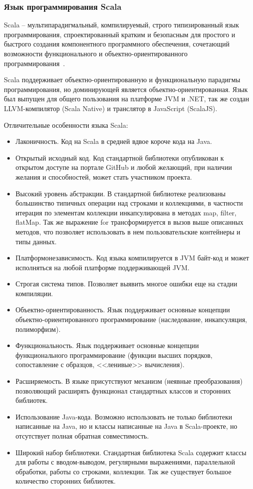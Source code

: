 \subsubsection{Язык программирования Scala}
\label{sub:techs:scala}
Scala – мультипарадигмальный, компилируемый, строго типизированный язык программирования, спроектированный кратким и безопасным для простого и быстрого создания компонентного программного обеспечения, сочетающий возможности функционального и объектно-ориентированного программирования~\cite{wiki_scala}.

Scala поддерживает объектно-ориентированную и функциональную парадигмы программирования, но доминирующей является объектно-ориентированная. Язык был выпущен для общего пользования на платформе JVM и .NET, так же создан LLVM-компилятор (Scala Native) и транслятор в JavaScript (ScalaJS).

Отличительные особенности языка Scala:
\begin{itemize}
  \item Лаконичность. Код на Scala в средней вдвое короче кода на Java.
  \item Открытый исходный код. Код стандартной библиотеки опубликован к открытом доступе на портале GitHub и любой желающий, при наличии желания и способностей, может стать участником проекта.
  \item Высокий уровень абстракции. В стандартной библиотеке реализованы большинство типичных операции над строками и коллекциями, в частности итерация по элементам коллекции инкапсулирована в методах map, filter, flatMap. Так же выражение for трансформируется в вызов выше описанных методов, что позволяет использовать в нем пользовательские контейнеры и типы данных.
  \item Платформонезависимость. Код языка компилируется в JVM байт-код и может исполняться на любой платформе поддерживающей JVM.
  \item Строгая система типов. Позволяет выявить многое ошибки еще на стадии компиляции.
  \item Объектно-ориентированность. Язык поддерживает основные концепции объектно-ориентированного программирование (наследование, инкапсуляция, полиморфизм).
  \item Функциональность. Язык поддерживает основные концепции функционального программирование (функции высших порядков, сопоставление с образцов, <<ленивые>> вычисления).
  \item Расширяемость. В языке присутствуют механизм (неявные преобразования) позволяющий расширять функционал стандартных классов и сторонних библиотек.
  \item Использование Java-кода. Возможно использовать не только библиотеки написанные на Java, но и классы написанные на Java в Scala-проекте, но отсутствует полная обратная совместимость.
  \item Широкий набор библиотеки. Стандартная библиотека Scala содержит классы для работы с вводом-выводом, регулярными выражениями, параллельной обработки, работы со строками, коллекции. Так же существует большое количество сторонних библиотек.
\end{itemize}

